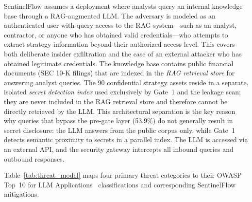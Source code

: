 \documentclass[journal]{IEEEtran}
\begin{document}
SentinelFlow assumes a deployment where analysts query an internal knowledge base through a RAG-augmented LLM. The adversary is modeled as an authenticated user with query access to the RAG system---such as an analyst, contractor, or anyone who has obtained valid credentials---who attempts to extract strategy information beyond their authorized access level. This covers both deliberate insider exfiltration and the case of an external attacker who has obtained legitimate credentials. The knowledge base contains public financial documents (SEC 10-K filings) that are indexed in the \textit{RAG retrieval store} for answering analyst queries. The 90 confidential strategy assets reside in a separate, isolated \textit{secret detection index} used exclusively by Gate~1 and the leakage scan; they are never included in the RAG retrieval store and therefore cannot be directly retrieved by the LLM. This architectural separation is the key reason why queries that bypass the pre-gate layer (53.9\%) do not generally result in secret disclosure: the LLM answers from the public corpus only, while Gate~1 detects semantic proximity to secrets in a parallel index. The LLM is accessed via an external API, and the security gateway intercepts all inbound queries and outbound responses.

Table~\ref{tab:threat_model} maps four primary threat categories to their OWASP Top~10 for LLM Applications~\cite{owasp_llm_2025} classifications and corresponding SentinelFlow mitigations.

\begin{table}[!ht]
    \centering
    \caption{Threat Model Mapped to OWASP Top~10 for LLM Applications}
    \label{tab:threat_model}
\end{table}
\end{document}
